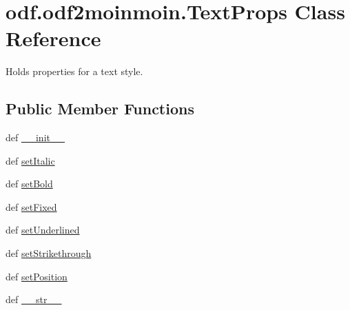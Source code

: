 \hypertarget{classodf_1_1odf2moinmoin_1_1TextProps}{\section{odf.\+odf2moinmoin.\+Text\+Props Class Reference}
\label{classodf_1_1odf2moinmoin_1_1TextProps}
}


Holds properties for a text style.  


\subsection*{Public Member Functions}
\begin{DoxyCompactItemize}
\item 
def \hyperlink{classodf_1_1odf2moinmoin_1_1TextProps_a1ade0318affae4dd50cc224e322844da}{\+\_\+\+\_\+init\+\_\+\+\_\+}
\item 
def \hyperlink{classodf_1_1odf2moinmoin_1_1TextProps_ae8595e3cbeb8353a5aba4599c0a0bed4}{set\+Italic}
\item 
def \hyperlink{classodf_1_1odf2moinmoin_1_1TextProps_ab5b65c847ecb144c247ffcbda288a4ca}{set\+Bold}
\item 
def \hyperlink{classodf_1_1odf2moinmoin_1_1TextProps_a36498ea16872e27d8279f02b0d2f6ce9}{set\+Fixed}
\item 
def \hyperlink{classodf_1_1odf2moinmoin_1_1TextProps_ac1f5eaeb017f7c0b18102c46a9b6fdc8}{set\+Underlined}
\item 
def \hyperlink{classodf_1_1odf2moinmoin_1_1TextProps_a4400a7d550f519a6c3de5921f77aeab1}{set\+Strikethrough}
\item 
def \hyperlink{classodf_1_1odf2moinmoin_1_1TextProps_aafb89be476b19469697c8ea12abb421a}{set\+Position}
\item 
def \hyperlink{classodf_1_1odf2moinmoin_1_1TextProps_a437f2858f4e8af5d57e153859172759c}{\+\_\+\+\_\+str\+\_\+\+\_\+}
\end{DoxyCompactItemize}
